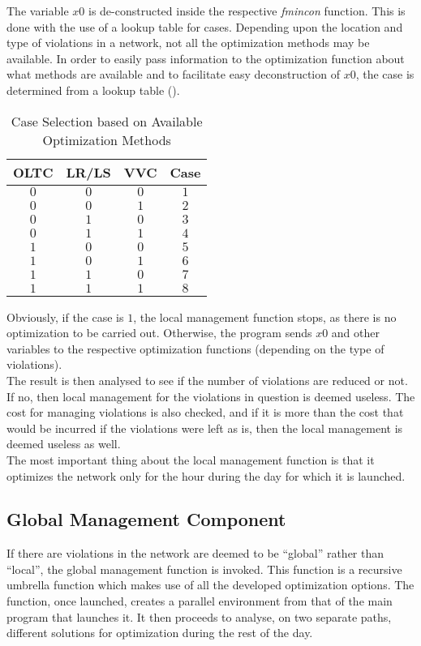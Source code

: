 The variable $x0$ is de-constructed inside the respective \emph{fmincon} function. This is done with the use of a lookup table for cases. Depending upon the location and type of violations in a network, not all the optimization methods may be available. In order to easily pass information to the optimization function about what methods are available and to facilitate easy deconstruction of $x0$, the case is determined from a lookup table ().

\begin{table}[!h]
\centering
\begin{tabular}{cccc}
\rowcolor{gray!25}
\textbf{OLTC} & \textbf{LR/LS} & \textbf{VVC} & \textbf{Case}\\
\hline
$0$ & $0$ & $0$ & $1$\\
\rowcolor{gray!15}
$0$ & $0$ & $1$ & $2$\\
$0$ & $1$ & $0$ & $3$\\
\rowcolor{gray!15}
$0$ & $1$ & $1$ & $4$\\
$1$ & $0$ & $0$ & $5$\\
\rowcolor{gray!15}
$1$ & $0$ & $1$ & $6$\\
$1$ & $1$ & $0$ & $7$\\
\rowcolor{gray!15}
$1$ & $1$ & $1$ & $8$\\
\hline
\end{tabular}
\caption{Case Selection based on Available Optimization Methods}
\end{table}

Obviously, if the case is $1$, the local management function stops, as there is no optimization to be carried out. Otherwise, the program sends $x0$ and other variables to the respective optimization functions (depending on the type of violations).\\

The result is then analysed to see if the number of violations are reduced or not. If no, then local management for the violations in question is deemed useless. The cost for managing violations is also checked, and if it is more than the cost that would be incurred if the violations were left as is, then the local management is deemed useless as well.\\

The most important thing about the local management function is that it optimizes the network only for the hour during the day for which it is launched.

\subsection{Global Management Component}
If there are violations in the network are deemed to be ``global'' rather than ``local'', the global management function is invoked. This function is a recursive umbrella function which makes use of all the developed optimization options. The function, once launched, creates a parallel environment from that of the main program that launches it. It then proceeds to analyse, on two separate paths, different solutions for optimization during the rest of the day.\\

